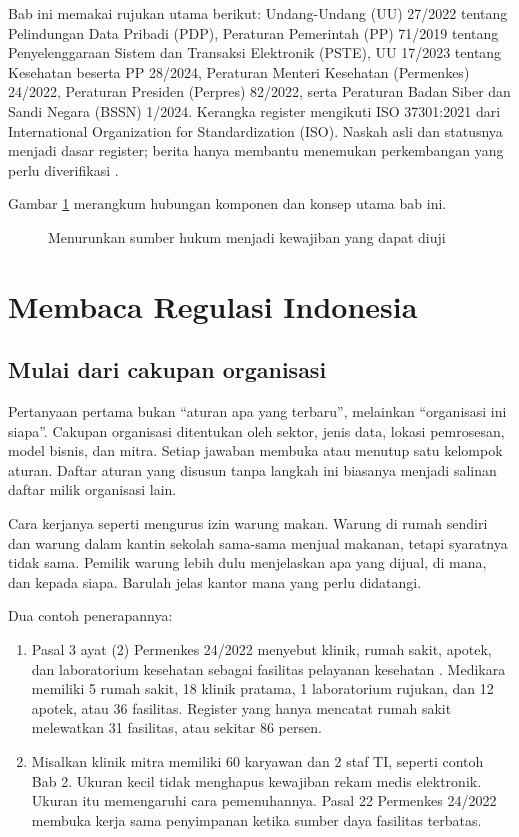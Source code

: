 Bab ini memakai rujukan utama berikut: Undang-Undang (UU) 27/2022 tentang Pelindungan Data
Pribadi (PDP), Peraturan Pemerintah (PP) 71/2019 tentang Penyelenggaraan Sistem dan Transaksi
Elektronik (PSTE), UU 17/2023 tentang Kesehatan beserta PP 28/2024, Peraturan Menteri Kesehatan
(Permenkes) 24/2022, Peraturan Presiden (Perpres) 82/2022, serta Peraturan Badan Siber dan
Sandi Negara (BSSN) 1/2024. Kerangka register mengikuti ISO 37301:2021 dari International
Organization for Standardization (ISO). Naskah asli dan statusnya menjadi dasar register;
berita hanya membantu menemukan perkembangan yang perlu diverifikasi
\cite{uu27-2022-pdp,pp71-2019-pste,c03-uu17,pp28-2024-kesehatan,permenkes24-2022,perpres82-2022-iiv,bssn1-2024,c03-iso37301}.

Gambar \ref{fig:ch03-ilustrasi-bab} merangkum hubungan komponen dan konsep utama bab ini.
\begin{figure}[!htb]
  \centering
  
  \caption{Menurunkan sumber hukum menjadi kewajiban yang dapat diuji}
  \label{fig:ch03-ilustrasi-bab}
\end{figure}

\section{Membaca Regulasi Indonesia}

\subsection*{Mulai dari cakupan organisasi}

Pertanyaan pertama bukan ``aturan apa yang terbaru'', melainkan ``organisasi ini siapa''.
Cakupan organisasi ditentukan oleh sektor, jenis data, lokasi pemrosesan, model bisnis, dan
mitra. Setiap jawaban membuka atau menutup satu kelompok aturan. Daftar aturan yang disusun
tanpa langkah ini biasanya menjadi salinan daftar milik organisasi lain.

Cara kerjanya seperti mengurus izin warung makan. Warung di rumah sendiri dan warung dalam
kantin sekolah sama-sama menjual makanan, tetapi syaratnya tidak sama. Pemilik warung lebih
dulu menjelaskan apa yang dijual, di mana, dan kepada siapa. Barulah jelas kantor mana yang
perlu didatangi.

Dua contoh penerapannya:
\begin{enumerate}
  \item Pasal 3 ayat (2) Permenkes 24/2022 menyebut klinik, rumah sakit, apotek, dan
  laboratorium kesehatan sebagai fasilitas pelayanan kesehatan \cite{permenkes24-2022}.
  Medikara memiliki 5 rumah sakit, 18 klinik pratama, 1 laboratorium rujukan, dan 12 apotek,
  atau 36 fasilitas. Register yang hanya mencatat rumah sakit melewatkan 31 fasilitas, atau
  sekitar 86 persen.
  \item Misalkan klinik mitra memiliki 60 karyawan dan 2 staf TI, seperti contoh Bab 2. Ukuran
  kecil tidak menghapus kewajiban rekam medis elektronik. Ukuran itu memengaruhi cara
  pemenuhannya. Pasal 22 Permenkes 24/2022 membuka kerja sama penyimpanan ketika sumber daya
  fasilitas terbatas.
\end{enumerate}

